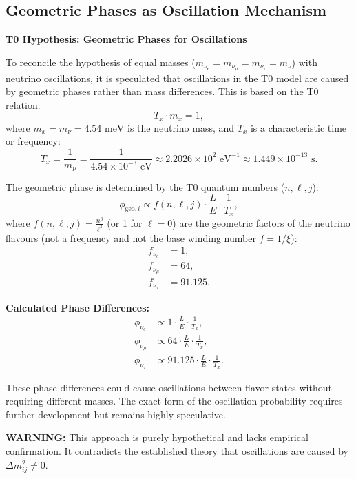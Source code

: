 	\subsection{Geometric Phases as Oscillation Mechanism}
	
	\begin{speculation}
		\textbf{T0 Hypothesis: Geometric Phases for Oscillations}
		
		To reconcile the hypothesis of equal masses (\(m_{\nu_e} = m_{\nu_\mu} = m_{\nu_\tau} = m_\nu\)) with neutrino oscillations, it is speculated that oscillations in the T0 model are caused by geometric phases rather than mass differences. This is based on the T0 relation:
		\[
		T_x \cdot m_x = 1,
		\]
		where \(m_x = m_\nu = 4.54 \text{ meV}\) is the neutrino mass, and \(T_x\) is a characteristic time or frequency:
		\[
		T_x = \frac{1}{m_\nu} = \frac{1}{4.54 \times 10^{-3} \text{ eV}} \approx 2.2026 \times 10^2 \text{ eV}^{-1} \approx 1.449 \times 10^{-13} \text{ s}.
		\]
		
		The geometric phase is determined by the T0 quantum numbers (\(n, \ell, j\)):
		\[
		\phi_{\text{geo}, i} \propto f(n, \ell, j) \cdot \frac{L}{E} \cdot \frac{1}{T_x},
		\]
		where \(f(n, \ell, j) = \frac{n^6}{\ell^3}\) (or 1 for \(\ell = 0\)) are the geometric factors of the neutrino flavours (not a frequency and not the base winding number $f = 1/\xi$):
		\begin{align}
			f_{\nu_e} &= 1, \\
			f_{\nu_\mu} &= 64, \\
			f_{\nu_\tau} &= 91.125.
		\end{align}
		
		\textbf{Calculated Phase Differences:}
		\begin{align}
			\phi_{\nu_e} &\propto 1 \cdot \frac{L}{E} \cdot \frac{1}{T_x}, \\
			\phi_{\nu_\mu} &\propto 64 \cdot \frac{L}{E} \cdot \frac{1}{T_x}, \\
			\phi_{\nu_\tau} &\propto 91.125 \cdot \frac{L}{E} \cdot \frac{1}{T_x}.
		\end{align}
		
		These phase differences could cause oscillations between flavor states without requiring different masses. The exact form of the oscillation probability requires further development but remains highly speculative.
		
		\textbf{WARNING:} This approach is purely hypothetical and lacks empirical confirmation. It contradicts the established theory that oscillations are caused by \(\Delta m^2_{ij} \neq 0\).
	\end{speculation}

